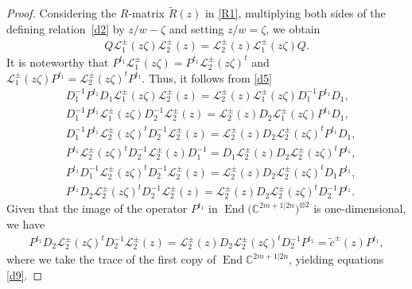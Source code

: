 \documentclass[pdftex]{sigma}
\numberwithin{equation}{section}
\begin{document}
\begin{proof}{Considering the $R$-matrix $\widetilde{R}(z)$ in \eqref{R1},}
multiplying both sides of the defining relation~\eqref{d2} by $z/w-\zeta$ and setting $z/w=\zeta$, we obtain
\begin{gather*}
Q\mathcal{L}_1^{\pm}(z\zeta)\mathcal{L}_2^{\pm}(z)=\mathcal{L}_2^{\pm}(z)\mathcal{L}_1^{\pm}(z\zeta)Q.
\end{gather*}
It is noteworthy that $P^{t_1}\mathcal{L}_1^{\pm}(z\zeta)=P^{t_1}\mathcal{L}_2^{\pm}(z\zeta)^t$ and $\mathcal{L}_1^{\pm}(z\zeta)P^{t_1}=\mathcal{L}_2^{\pm}(z\zeta)^tP^{t_1}$.
Thus, it follows from \eqref{d5}
\begin{align*}
 &D_1^{-1}P^{t_1}D_1\mathcal{L}_1^{\pm}(z\zeta)\mathcal{L}_2^{\pm}(z)=\mathcal{L}_2^{\pm}(z)\mathcal{L}_1^{\pm}(z\zeta)D_1^{-1}P^{t_1}D_1,\\
 &D_1^{-1}P^{t_1}\mathcal{L}_1^{\pm}(z\zeta)D_2^{-1}\mathcal{L}_2^{\pm}(z)=\mathcal{L}_2^{\pm}(z)D_2\mathcal{L}_1^{\pm}(z\zeta)P^{t_1}D_1,\\
 &D_1^{-1}P^{t_1}\mathcal{L}_2^{\pm}(z\zeta)^tD_2^{-1}\mathcal{L}_2^{\pm}(z)=\mathcal{L}_2^{\pm}(z)D_2\mathcal{L}_2^{\pm}(z\zeta)^tP^{t_1}D_1,\\
 &P^{t_1}\mathcal{L}_2^{\pm}(z\zeta)^tD_2^{-1}\mathcal{L}_2^{\pm}(z)D_1^{-1}=D_1\mathcal{L}_2^{\pm}(z)D_2\mathcal{L}_2^{\pm}(z\zeta)^tP^{t_1},\\
 &P^{t_1}D_1^{-1}\mathcal{L}_2^{\pm}(z\zeta)^tD_2^{-1}\mathcal{L}_2^{\pm}(z)=\mathcal{L}_2^{\pm}(z)D_2\mathcal{L}_2^{\pm}(z\zeta)^tD_1P^{t_1},\\
 &P^{t_1}D_2\mathcal{L}_2^{\pm}(z\zeta)^tD_2^{-1}\mathcal{L}_2^{\pm}(z)=\mathcal{L}_2^{\pm}(z)D_2\mathcal{L}_2^{\pm}(z\zeta)^tD_2^{-1}P^{t_1}.
\end{align*}
Given that the image of the operator $P^{t_1}$ in $\operatorname{End}\bigl(\mathbb{C}^{2m+1|2n}\bigr)^{\otimes2}$ is one-dimensional, we have
\begin{gather*}
 P^{t_1}D_2\mathcal{L}_2^{\pm}(z\zeta)^tD_2^{-1}\mathcal{L}_2^{\pm}(z)=\mathcal{L}_2^{\pm}(z)D_2\mathcal{L}_2^{\pm}(z\zeta)^tD_2^{-1}P^{t_1}=\widetilde{c}^{\pm}(z)P^{t_1},
\end{gather*}
where we take the trace of the first copy of $\operatorname{End}\mathbb{C}^{2m+1|2n}$, yielding equations \eqref{d9}.


\end{proof}
\end{document}

